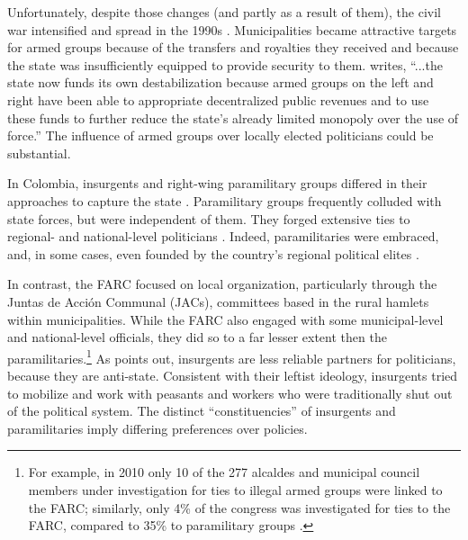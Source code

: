 Unfortunately, despite those changes (and partly as a result of them), the civil war intensified and spread in the 1990s \citep{sanchezmar-palau06a, steeleschubiger15a,steele17a}. Municipalities became attractive targets for armed groups because of the transfers and royalties they received and because the state was insufficiently equipped to provide security to them. \citet[537]{eaton06a} writes, ``...the state now funds its own destabilization because armed groups on the left and right have been able to appropriate decentralized public revenues and to use these funds to further reduce the state's already limited monopoly over the use of force.'' The influence of armed groups over locally elected politicians could be substantial.   

In Colombia, insurgents and right-wing paramilitary groups differed in their approaches to capture the state \citep{lopez-hernandez10a, eaton06a, 07a}. Paramilitary groups frequently colluded with state forces, but were independent of them. They forged extensive ties to regional- and national-level politicians \citep[16]{gutierrez-sanin10c}. Indeed, paramilitaries were embraced, and, in some cases, even founded by the country's regional political elites \citep{romero03a, ronderos14a, duncan06a}.  

In contrast, the FARC focused on local organization, particularly through the Juntas de Acci\'{o}n Communal (JACs), committees based in the rural hamlets within municipalities. While the FARC also engaged with some municipal-level and national-level officials, they did so to a far lesser extent then the paramilitaries.\footnote{For example, in 2010 only 10 of the 277 alcaldes and municipal council members under investigation for ties to illegal armed groups were linked to the FARC; similarly, only 4\% of the congress was investigated for ties to the FARC, compared to 35\% to paramilitary groups \citep[33]{lopez-hernandez10a}.} As \citet[18-19]{gutierrez-sanin10c} points out, insurgents are less reliable partners for politicians, because they are anti-state. Consistent with their leftist ideology, insurgents tried to mobilize and work with peasants and workers who were traditionally shut out of the political system.  The distinct ``constituencies'' of insurgents and paramilitaries imply differing preferences over policies.

